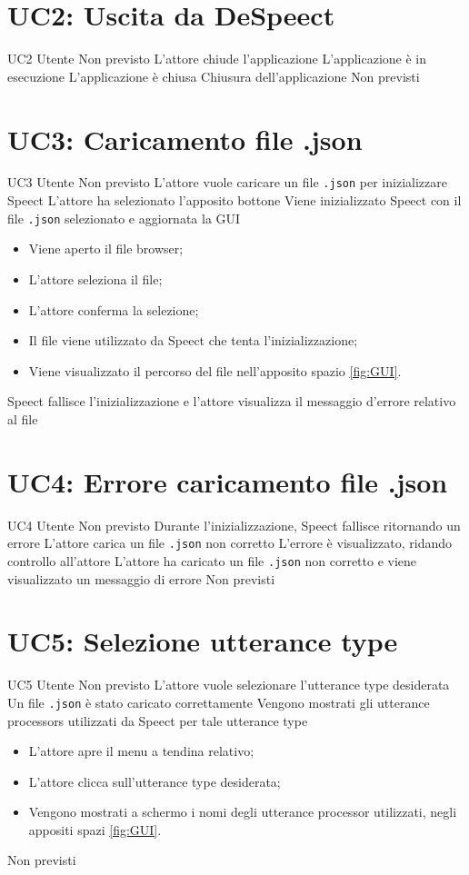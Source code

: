 \documentclass[../AnalisideiRequisiti.tex]{subfiles}
\begin{document}
	\section{UC2: Uscita da DeSpeect}
	\UserCase
	{UC2}
	{Utente}
	{Non previsto}
	{L'attore chiude l'applicazione}
	{L'applicazione è in esecuzione}
	{L'applicazione è chiusa}
	{Chiusura dell'applicazione}
	{Non previsti}
	
	\section{UC3: Caricamento file .json}
	\UserCase
	{UC3}
	{Utente}
	{Non previsto}
	{L'attore vuole caricare un file \verb|.json| per inizializzare Speect}
	{L'attore ha selezionato l'apposito bottone}
	{Viene inizializzato Speect con il file \verb|.json| selezionato e aggiornata la GUI}
	{
		\begin{itemize}
			\item{} Viene aperto il file browser;
			\item{} L'attore seleziona il file;
			\item{} L'attore conferma la selezione;
			\item{} Il file viene utilizzato da Speect che tenta l'inizializzazione;
			\item{} Viene visualizzato il percorso del file nell'apposito spazio \ref{fig:GUI}.
		\end{itemize}
	}
	{Speect fallisce l'inizializzazione e l'attore visualizza il messaggio d'errore relativo al file }
	
	\section{UC4: Errore caricamento file .json}
	\UserCase
	{UC4}
	{Utente}
	{Non previsto}
	{Durante l'inizializzazione, Speect fallisce ritornando un errore}
	{L'attore carica un file \verb|.json| non corretto}
	{L'errore è visualizzato, ridando controllo all'attore}
	{L'attore ha caricato un file \verb|.json| non corretto e viene visualizzato un messaggio di errore}
	{Non previsti}
	
	\section{UC5: Selezione utterance type}
	\UserCase
	{UC5}
	{Utente}
	{Non previsto}
	{L'attore vuole selezionare l'utterance type desiderata}
	{Un file \verb|.json| è stato caricato correttamente }
	{Vengono mostrati gli utterance processors utilizzati da Speect per tale utterance type}
	{
		\begin{itemize}
			\item{} L'attore apre il menu a tendina relativo;
			\item{} L'attore clicca sull'utterance type desiderata;
			\item{} Vengono mostrati a schermo i nomi degli utterance processor utilizzati, negli appositi spazi \ref{fig:GUI}.
		\end{itemize}
	}
	{Non previsti}
	
\end{document}
